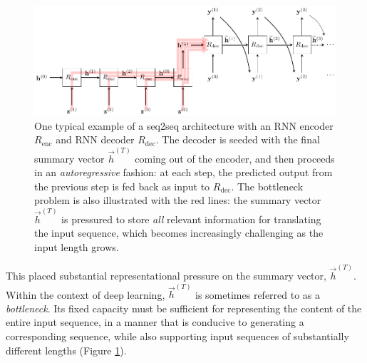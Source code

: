 \begin{figure}
    \centering
    \includegraphics[width=\linewidth]{figures/bottle_rnn.pdf}
    \caption{One typical example of a seq2seq architecture with an RNN encoder $R_\mathrm{enc}$ and RNN decoder $R_\mathrm{dec}$. The decoder is seeded with the final summary vector $\vec{h}^{(T)}$ coming out of the encoder, and then proceeds in an \emph{autoregressive} fashion: at each step, the predicted output from the previous step is fed back as input to $R_\mathrm{dec}$. The bottleneck problem is also illustrated with the red lines: the summary vector $\vec{h}^{(T)}$ is pressured to store \emph{all} relevant information for translating the input sequence, which becomes increasingly challenging as the input length grows.}
    \label{fig:rnn_bottleneck}
\end{figure}

This placed substantial representational pressure on the summary vector, $\vec{h}^{(T)}$. Within the context of deep learning, $\vec{h}^{(T)}$ is sometimes referred to as a \emph{bottleneck}. Its fixed capacity must be sufficient for representing the content of the entire input sequence, in a manner that is conducive to generating a corresponding sequence, while also supporting input sequences of substantially different lengths (Figure \ref{fig:rnn_bottleneck}).

